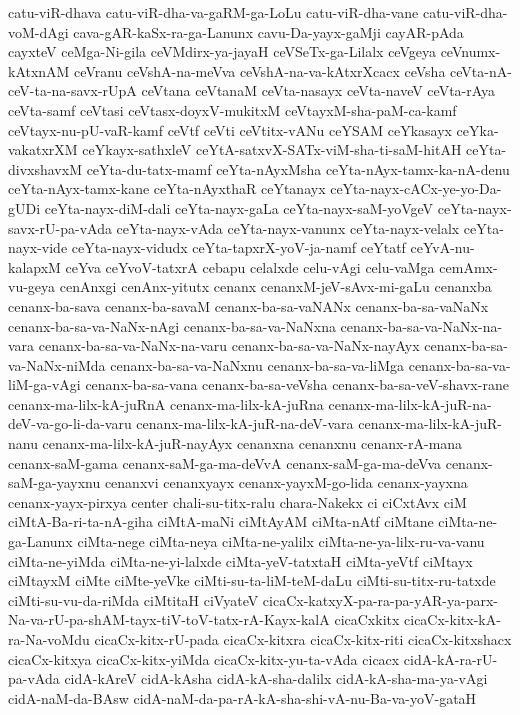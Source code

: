 {catu-viR-dhava
catu-viR-dha-va-gaRM-ga-LoLu
catu-viR-dha-vane
catu-viR-dha-voM-dAgi
cava-gAR-kaSx-ra-ga-Lanunx
cavu-Da-yayx-gaMji
cayAR-pAda
cayxteV
ceMga-Ni-gila
ceVMdirx-ya-jayaH
ceVSeTx-ga-Lilalx
ceVgeya
ceVnumx-kAtxnAM
ceVranu
ceVshA-na-meVva
ceVshA-na-va-kAtxrXcacx
ceVsha
ceVta-nA-ceV-ta-na-savx-rUpA
ceVtana
ceVtanaM
ceVta-nasayx
ceVta-naveV
ceVta-rAya
ceVta-samf
ceVtasi
ceVtasx-doyxV-mukitxM
ceVtayxM-sha-paM-ca-kamf
ceVtayx-nu-pU-vaR-kamf
ceVtf
ceVti
ceVtitx-vANu
ceYSAM
ceYkasayx
ceYka-vakatxrXM
ceYkayx-sathxleV
ceYtA-satxvX-SATx-viM-sha-ti-saM-hitAH
ceYta-divxshavxM
ceYta-du-tatx-mamf
ceYta-nAyxMsha
ceYta-nAyx-tamx-ka-nA-denu
ceYta-nAyx-tamx-kane
ceYta-nAyxthaR
ceYtanayx
ceYta-nayx-cACx-ye-yo-Da-gUDi
ceYta-nayx-diM-dali
ceYta-nayx-gaLa
ceYta-nayx-saM-yoVgeV
ceYta-nayx-savx-rU-pa-vAda
ceYta-nayx-vAda
ceYta-nayx-vanunx
ceYta-nayx-velalx
ceYta-nayx-vide
ceYta-nayx-vidudx
ceYta-tapxrX-yoV-ja-namf
ceYtatf
ceYvA-nu-kalapxM
ceYva
ceYvoV-tatxrA
cebapu
celalxde
celu-vAgi
celu-vaMga
cemAmx-vu-geya
cenAnxgi
cenAnx-yitutx
cenanx
cenanxM-jeV-sAvx-mi-gaLu
cenanxba
cenanx-ba-sava
cenanx-ba-savaM
cenanx-ba-sa-vaNANx
cenanx-ba-sa-vaNaNx
cenanx-ba-sa-va-NaNx-nAgi
cenanx-ba-sa-va-NaNxna
cenanx-ba-sa-va-NaNx-na-vara
cenanx-ba-sa-va-NaNx-na-varu
cenanx-ba-sa-va-NaNx-nayAyx
cenanx-ba-sa-va-NaNx-niMda
cenanx-ba-sa-va-NaNxnu
cenanx-ba-sa-va-liMga
cenanx-ba-sa-va-liM-ga-vAgi
cenanx-ba-sa-vana
cenanx-ba-sa-veVsha
cenanx-ba-sa-veV-shavx-rane
cenanx-ma-lilx-kA-juRnA
cenanx-ma-lilx-kA-juRna
cenanx-ma-lilx-kA-juR-na-deV-va-go-li-da-varu
cenanx-ma-lilx-kA-juR-na-deV-vara
cenanx-ma-lilx-kA-juR-nanu
cenanx-ma-lilx-kA-juR-nayAyx
cenanxna
cenanxnu
cenanx-rA-mana
cenanx-saM-gama
cenanx-saM-ga-ma-deVvA
cenanx-saM-ga-ma-deVva
cenanx-saM-ga-yayxnu
cenanxvi
cenanxyayx
cenanx-yayxM-go-lida
cenanx-yayxna
cenanx-yayx-pirxya
center
chali-su-titx-ralu
chara-Nakekx
ci
ciCxtAvx
ciM
ciMtA-Ba-ri-ta-nA-giha
ciMtA-maNi
ciMtAyAM
ciMta-nAtf
ciMtane
ciMta-ne-ga-Lanunx
ciMta-nege
ciMta-neya
ciMta-ne-yalilx
ciMta-ne-ya-lilx-ru-va-vanu
ciMta-ne-yiMda
ciMta-ne-yi-lalxde
ciMta-yeV-tatxtaH
ciMta-yeVtf
ciMtayx
ciMtayxM
ciMte
ciMte-yeVke
ciMti-su-ta-liM-teM-daLu
ciMti-su-titx-ru-tatxde
ciMti-su-vu-da-riMda
ciMtitaH
ciVyateV
cicaCx-katxyX-pa-ra-pa-yAR-ya-parx-Na-va-rU-pa-shAM-tayx-tiV-toV-tatx-rA-Kayx-kalA
cicaCxkitx
cicaCx-kitx-kA-ra-Na-voMdu
cicaCx-kitx-rU-pada
cicaCx-kitxra
cicaCx-kitx-riti
cicaCx-kitxshacx
cicaCx-kitxya
cicaCx-kitx-yiMda
cicaCx-kitx-yu-ta-vAda
cicacx
cidA-kA-ra-rU-pa-vAda
cidA-kAreV
cidA-kAsha
cidA-kA-sha-dalilx
cidA-kA-sha-ma-ya-vAgi
cidA-naM-da-BAsw
cidA-naM-da-pa-rA-kA-sha-shi-vA-nu-Ba-va-yoV-gataH
}
